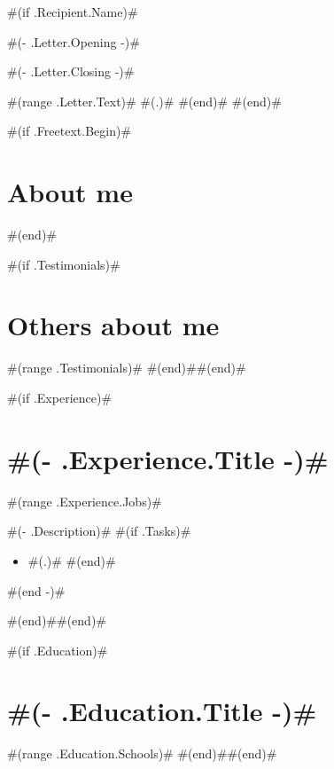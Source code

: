 \documentclass[10pt,a4paper,sans]{moderncv}
\begin{document}
#(if .Recipient.Name)#
  \date{ #(- .Letter.Date -)# }
  \opening{ #(- .Letter.Opening -)# }
  \closing{ #(- .Letter.Closing -)# }
  \makelettertitle
  #(range .Letter.Text)#
    #(.)#
  #(end)#
  \makeletterclosing
  \pagebreak
#(end)#


\makecvtitle

#(if .Freetext.Begin)#\section{About me}
#(end)#

#(if .Testimonials)#\section{Others about me}
#(range .Testimonials)#
#(end)##(end)#

#(if .Experience)#\section{ #(- .Experience.Title -)#  }
#(range .Experience.Jobs)#
{ #(- .Description)# 
  #(if .Tasks)#\begin{itemize}
    #(range .Tasks)# \item #(.)#
    #(end)#\end{itemize}
  #(end -)# }
#(end)##(end)#

#(if .Education)#\section{ #(- .Education.Title -)#  }
#(range .Education.Schools)#
#(end)##(end)#
\end{document}
